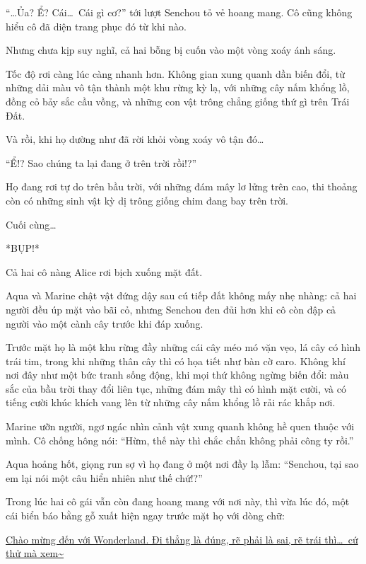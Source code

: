 \documentclass[../main.tex]{subfiles}
\begin{document}
``\dots Ủa? Ể? Cái\dots\ Cái gì cơ?'' tới lượt Senchou tỏ vẻ hoang mang. Cô cũng không hiểu cô đã diện trang phục đó từ khi nào.

Nhưng chưa kịp suy nghĩ, cả hai bỗng bị cuốn vào một vòng xoáy ánh sáng.

Tốc độ rơi càng lúc càng nhanh hơn. Không gian xung quanh dần biến đổi, từ những dải màu vô tận thành một khu rừng kỳ lạ, với những cây nấm khổng lồ, đồng cỏ bảy sắc cầu vồng, và những con vật trông chẳng giống thứ gì trên Trái Đất.

Và rồi, khi họ dường như đã rời khỏi vòng xoáy vô tận đó\dots

``Ể!? Sao chúng ta lại đang ở trên trời rồi!?''

Họ đang rơi tự do trên bầu trời, với những đám mây lơ lửng trên cao, thi thoảng còn có những sinh vật kỳ dị trông giống chim đang bay trên trời.

Cuối cùng\dots

*BỤP!*

Cả hai cô nàng Alice rơi bịch xuống mặt đất.

\ct

Aqua và Marine chật vật đứng dậy sau cú tiếp đất không mấy nhẹ nhàng: cả hai người đều úp mặt vào bãi cỏ, nhưng Senchou đen đủi hơn khi cô còn đập cả người vào một cành cây trước khi đáp xuống.

Trước mặt họ là một khu rừng đầy những cái cây méo mó vặn vẹo, lá cây có hình trái tim, trong khi những thân cây thì có họa tiết như bàn cờ caro. Không khí nơi đây như một bức tranh sống động, khi mọi thứ không ngừng biến đổi: màu sắc của bầu trời thay đổi liên tục, những đám mây thì có hình mặt cười, và có tiếng cười khúc khích vang lên từ những cây nấm khổng lồ rải rác khắp nơi.

Marine ưỡn người, ngơ ngác nhìn cảnh vật xung quanh không hề quen thuộc với mình. Cô chống hông nói: ``Hừm, thế này thì chắc chắn không phải công ty rồi.''

Aqua hoảng hốt, giọng run sợ vì họ đang ở một nơi đầy lạ lẫm: ``Senchou, tại sao em lại nói một câu hiển nhiên như thế chứ!?''

Trong lúc hai cô gái vẫn còn đang hoang mang với nơi này, thì vừa lúc đó, một cái biển báo bằng gỗ xuất hiện ngay trước mặt họ với dòng chữ:

\begin{center}
    \uline{Chào mừng đến với Wonderland. Đi thẳng là đúng, rẽ phải là sai, rẽ trái thì\dots\ cứ thử mà xem\~{}}
\end{center}
\end{document}
